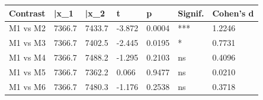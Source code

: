 \begin{tabular}{lllllll}
\toprule
Contrast & \bar{x}_1 & \bar{x}_2 & t & p & Signif. & Cohen's d \\
\midrule
M1 vs M2 & 7366.7 & 7433.7 & -3.872 & 0.0004 & *** & 1.2246 \\
M1 vs M3 & 7366.7 & 7402.5 & -2.445 & 0.0195 & * & 0.7731 \\
M1 vs M4 & 7366.7 & 7488.2 & -1.295 & 0.2103 & ns & 0.4096 \\
M1 vs M5 & 7366.7 & 7362.2 & 0.066 & 0.9477 & ns & 0.0210 \\
M1 vs M6 & 7366.7 & 7480.3 & -1.176 & 0.2538 & ns & 0.3718 \\
\bottomrule
\end{tabular}
